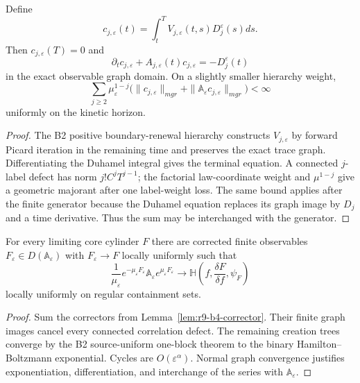 \begin{lemma}
\label{lem:r9-b4-corrector}
Define
\[
 c_{j,\varepsilon}(t)
 =\int_t^T V_{j,\varepsilon}(t,s)D_j^\varepsilon(s)ds.
\]
Then $c_{j,\varepsilon}(T)=0$ and
\[
 \partial_tc_{j,\varepsilon}
 +A_{j,\varepsilon}(t)c_{j,\varepsilon}
 =-D_j^\varepsilon(t)
\]
in the exact observable graph domain.  On a slightly smaller hierarchy
weight,
\[
 \sum_{j\ge2}
 \mu_\varepsilon^{1-j}
 \bigl(
  \|c_{j,\varepsilon}\|_{
m gr}
  +\|\mathbb A_\varepsilon c_{j,\varepsilon}\|_{
m gr}
 \bigr)<\infty
\]
uniformly on the kinetic horizon.
\end{lemma}

\begin{proof}
The B2 positive boundary-renewal hierarchy constructs
$V_{j,\varepsilon}$ by forward Picard iteration in the remaining time and
preserves the exact trace graph.  Differentiating the Duhamel integral gives
the terminal equation.  A connected $j$-label defect has norm
$j!C^jT^{j-1}$; the factorial law-coordinate weight and
$\mu^{1-j}$ give a geometric majorant after one label-weight loss.  The same
bound applies after the finite generator because the Duhamel equation replaces
its graph image by $D_j$ and a time derivative.  Thus the sum may be
interchanged with the generator.
\end{proof}

\begin{theorem}
\label{thm:r9-b4-generator}
For every limiting core cylinder $F$ there are corrected finite observables
$F_\varepsilon\in D(\mathbb A_\varepsilon)$ with
$F_\varepsilon\to F$ locally uniformly such that
\[
 \frac1{\mu_\varepsilon}
 e^{-\mu_\varepsilon F_\varepsilon}
 \mathbb A_\varepsilon e^{\mu_\varepsilon F_\varepsilon}
 \longrightarrow
 \mathbb H\left(f,\frac{\delta F}{\delta f},\psi_F\right)
\]
locally uniformly on regular containment sets.
\end{theorem}

\begin{proof}
Sum the correctors from Lemma~\ref{lem:r9-b4-corrector}.  Their finite graph
images cancel every connected correlation defect.  The remaining creation
trees converge by the B2 source-uniform one-block theorem to the binary
Hamilton--Boltzmann exponential.  Cycles are $O(\varepsilon^\alpha)$.
Normal graph convergence justifies exponentiation, differentiation, and
interchange of the series with $\mathbb A_\varepsilon$.
\end{proof}


